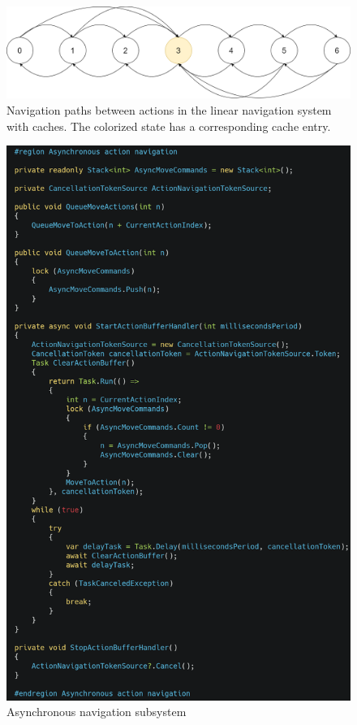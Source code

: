 \begin{figure}
\caption{Navigation paths between actions in the linear navigation system with caches. The colorized state has a corresponding cache entry.}
\label{fig:navsystem.cache.overview}
\includegraphics[width=\textwidth]{figures/navigationsystem-cache-overview-2.png}
\end{figure}

\begin{figure}
\caption{Asynchronous navigation subsystem}
\label{fig:async.navigation}
\includegraphics[width=\textwidth]{figures/async-navigation.png}
\end{figure}


